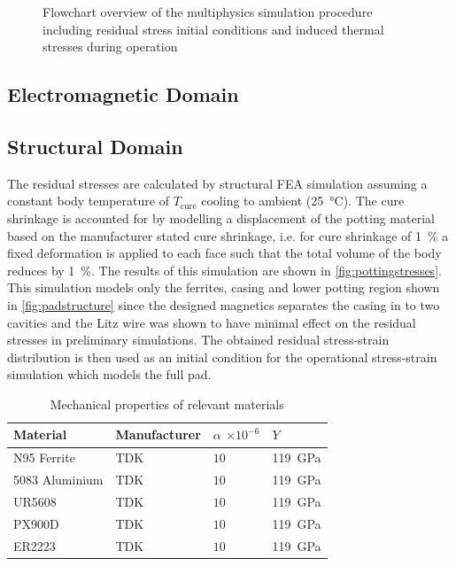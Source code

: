 \documentclass[conference]{IEEEtran}
\begin{document}
\begin{figure}
  
  \caption{Flowchart overview of the multiphysics simulation procedure including residual stress initial conditions and induced thermal stresses during operation}
  \label{fig:simulationflowchart}
\end{figure}

\subsection{Electromagnetic Domain}

\lipsum[2]

\subsection{Structural Domain} 

The residual stresses are calculated by structural FEA simulation assuming a constant body temperature of $T_\text{cure}$ cooling to ambient (\SI{25}{\celsius}). 
The cure shrinkage is accounted for by modelling a displacement of the potting material based on the manufacturer stated cure shrinkage, i.e. for cure shrinkage of \SI{1}{\percent} a fixed deformation is applied to each face such that the total volume of the body reduces by \SI{1}{\percent}.
The results of this simulation are shown in \cref{fig:pottingstresses}. 
This simulation models only the ferrites, casing and lower potting region shown in \cref{fig:padstructure} since the designed magnetics separates the casing in to two cavities and the Litz wire was shown to have minimal effect on the residual stresses in preliminary simulations. 
The obtained residual stress-strain distribution is then used as an initial condition for the operational stress-strain simulation which models the full pad. 

\lipsum[2]

\begin{table}
  \centering
  \caption{Mechanical properties of relevant materials}
  \begin{tabular}{@{}llll@{}}
    \toprule
    Material & Manufacturer & $\alpha$ $\times 10^{-6}$ & $Y$ \\ \midrule
    N95 Ferrite & TDK & $10$ & \SI{119}{\giga\pascal} \\
    5083 Aluminium & TDK & $10$ & \SI{119}{\giga\pascal} \\
    UR5608 & TDK & $10$ & \SI{119}{\giga\pascal} \\
    PX900D & TDK & $10$ & \SI{119}{\giga\pascal} \\
    ER2223 & TDK & $10$ & \SI{119}{\giga\pascal} \\
    \bottomrule
  \end{tabular}
\end{table}
\end{document}
